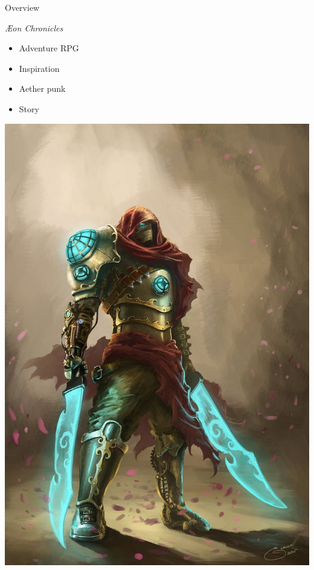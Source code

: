\documentclass{../teamepsilon}
\title{\aeon}
\author{\te}
\institute{Colorado School of Mines}
\newcommand\aeon{\textit{\AE on Chronicles}\xspace}
\begin{document}
\begin{frame}{Overview}
    \begin{minipage}{0.55\textwidth}
        \aeon
        \begin{itemize}
            \item Adventure RPG
            \item Inspiration
            \item Aether punk
            \item Story
        \end{itemize}
    \end{minipage}%
    \begin{minipage}{0.45\textwidth}
        \includegraphics[scale=0.15]{../graphics/warrior}
    \end{minipage}
\end{frame}
\end{document}
